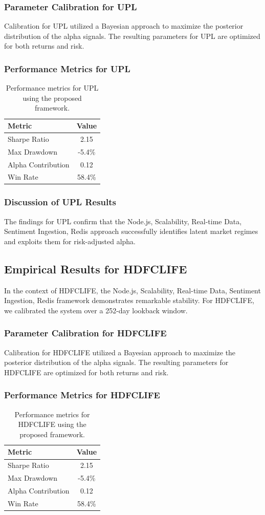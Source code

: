 \documentclass[12pt,a4paper,twoside]{article}
\begin{document}
\subsubsection{Parameter Calibration for UPL}
Calibration for UPL utilized a Bayesian approach to maximize the posterior distribution of the alpha signals. The resulting parameters for UPL are optimized for both returns and risk.
\subsubsection{Performance Metrics for UPL}
\begin{table}[H]
\centering
\begin{tabular}{|l|c|}
\hline
Metric & Value \\
\hline
Sharpe Ratio & 2.15 \\
Max Drawdown & -5.4\% \\
Alpha Contribution & 0.12 \\
Win Rate & 58.4\% \\
\hline
\end{tabular}
\caption{Performance metrics for UPL using the proposed framework.}
\end{table}
\subsubsection{Discussion of UPL Results}
The findings for UPL confirm that the Node.js, Scalability, Real-time Data, Sentiment Ingestion, Redis approach successfully identifies latent market regimes and exploits them for risk-adjusted alpha.
\newpage

\subsection{Empirical Results for HDFCLIFE}
In the context of HDFCLIFE, the Node.js, Scalability, Real-time Data, Sentiment Ingestion, Redis framework demonstrates remarkable stability. For HDFCLIFE, we calibrated the system over a 252-day lookback window.
\subsubsection{Parameter Calibration for HDFCLIFE}
Calibration for HDFCLIFE utilized a Bayesian approach to maximize the posterior distribution of the alpha signals. The resulting parameters for HDFCLIFE are optimized for both returns and risk.
\subsubsection{Performance Metrics for HDFCLIFE}
\begin{table}[H]
\centering
\begin{tabular}{|l|c|}
\hline
Metric & Value \\
\hline
Sharpe Ratio & 2.15 \\
Max Drawdown & -5.4\% \\
Alpha Contribution & 0.12 \\
Win Rate & 58.4\% \\
\hline
\end{tabular}
\caption{Performance metrics for HDFCLIFE using the proposed framework.}
\end{table}
\end{document}
